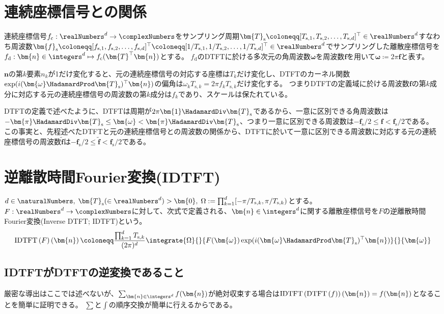    \section{連続座標信号との関係}
        連続座標信号$f_\text{c}:\realNumbers^d\to\complexNumbers$をサンプリング周期$\bm{T}_\text{s} \coloneqq [T_{\text{s},1}, T_{\text{s},2}, \dotsc, T_{\text{s},d}]^\top\in\realNumbers^d$すなわち周波数$\bm{f}_\text{s} \coloneqq [f_{\text{s},1}, f_{\text{s},2}, \dotsc, f_{\text{s},d}]^\top \coloneqq [1/T_{\text{s},1}, 1/T_{\text{s},2}, \dotsc, 1/T_{\text{s},d}]^\top\in\realNumbers^d$でサンプリングした離散座標信号を$f_\text{d}: \bm{n}\in\integers^d\mapsto f_\text{c}(\bm{T}^\top\bm{n})$とする。
        $f_\text{d}$のDTFTに於ける多次元の角周波数$\bm{\omega}$を周波数$\bm{f}$を用いて$\bm{\omega} \coloneqq 2\pi\bm{f}$と表す。
        \par
        $\bm{n}$の第$k$要素$n_k$が1だけ変化すると、元の連続座標信号の対応する座標は$T_k$だけ変化し、DTFTのカーネル関数$\exp(i(\bm{\omega}\HadamardProd\bm{T}_\text{s})^\top\bm{n})$の偏角は$\omega_k T_{\text{s},k} = 2\pi f_k T_{\text{s},k}$だけ変化する。
        つまりDTFTの定義域に於ける周波数$\bm{f}$の第$k$成分に対応する元の連続座標信号の周波数の第$k$成分は$f_k$であり、スケールは保たれている。
        \par
        DTFTの定義で述べたように、DTFTは周期が$2\pi\bm{1}\HadamardDiv\bm{T}_\text{s}$であるから、一意に区別できる角周波数は$-\bm{\pi}\HadamardDiv\bm{T}_\text{s} \leq \bm{\omega} < \bm{\pi}\HadamardDiv\bm{T}_\text{s}$、つまり一意に区別できる周波数は$-\bm{f}_\text{s}/2 \leq \bm{f} < \bm{f}_\text{s}/2$である。
        この事実と、先程述べたDTFTと元の連続座標信号との周波数の関係から、DTFTに於いて一意に区別できる周波数に対応する元の連続座標信号の周波数$\tilde{\bm{f}}$は$-\bm{f}_\text{s}/2 \leq \tilde{\bm{f}} < \bm{f}_\text{s}/2$である。
    \section{逆離散時間Fourier変換(IDTFT)}
        $d\in\naturalNumbers,\;\bm{T}_\text{s}(\in\realNumbers^d)>\bm{0},\;\Omega := \prod_{k=1}^d [-\pi/T_{\text{s},k},\pi/T_{\text{s},k})$とする。
        $F:\realNumbers^d\to\complexNumbers$に対して、次式で定義される、$\bm{n}\in\integers^d$に関する離散座標信号を$F$の逆離散時間Fourier変換(Inverse DTFT; IDTFT)という。
        \[ \IDTFTwithArg{F}{\bm{n}} \coloneqq \frac{\prod_{k=1}^d T_{\text{s},k}}{(2\pi)^d}\integrate{\Omega}{}{F(\bm{\omega})\exp(i(\bm{\omega}\HadamardProd\bm{T}_\text{s})^\top\bm{n})}{}{\bm{\omega}} \]
        \subsection{IDTFTがDTFTの逆変換であること}
            厳密な導出はここでは述べないが、$\sum_{\bm{n}\in\integers^d} f(\bm{n})$が絶対収束する場合は$\IDTFTwithArg{\DTFT{f}}{\bm{n}} = f(\bm{n})$となることを簡単に証明できる。
            $\sum$と$\int$の順序交換が簡単に行えるからである。
